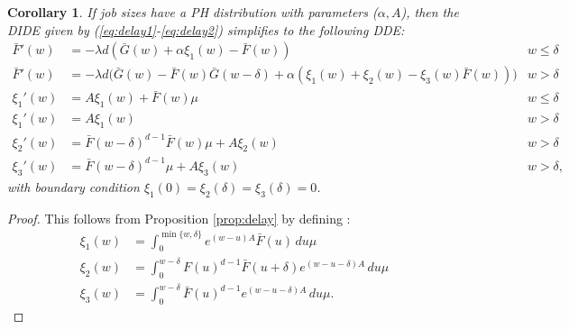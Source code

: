 \documentclass[12pt]{report}
\newtheorem{corollary}[theorem]{Corollary}
\begin{document}
\begin{corollary}
If job sizes have a PH distribution with parameters ($\alpha, A$), then the DIDE given by (\ref{eq:delay1}-\ref{eq:delay2}) simplifies to the following DDE:
\begin{align*}
\bar F'(w) &= -\lambda d (\bar G(w) + \alpha \xi_1(w) - \bar F(w)) & w \leq \delta\\
\bar F'(w) &= -\lambda d \bigg( \bar G(w) - \bar F(w) \bar G(w-\delta) + \alpha (\xi_1(w) + \xi_2(w) - \xi_3(w) \bar F(w)) \bigg) & w > \delta\\
\xi_1'(w) &= A \xi_1(w) + \bar F(w) \mu & w \leq \delta\\
\xi_1'(w) &= A \xi_1(w) & w > \delta\\
\xi_2'(w) &= \bar F(w-\delta)^{d-1} \bar F(w) \mu + A \xi_2(w) & w > \delta\\
\xi_3'(w) &= \bar F(w-\delta)^{d-1} \mu + A \xi_3(w) & w > \delta,
\end{align*}
with boundary condition $\xi_1(0) = \xi_2(\delta) = \xi_3(\delta) = 0$.
\end{corollary}
\begin{proof}
This follows from Proposition \ref{prop:delay} by defining :
\begin{align*}
\xi_1(w) & = \int_0^{\min\{w,\delta\}} e^{(w-u)A} \bar F(u) \, du \mu \\
\xi_2(w) &= \int_0^{w-\delta} F(u)^{d-1} \bar F(u+\delta) e^{(w-u-\delta)A} \, du \mu\\
\xi_3(w) &= \int_0^{w-\delta} \bar F(u)^{d-1} e^{(w-u-\delta)A} \, du \mu.
\end{align*}
\end{proof}
\color{black}
\end{document}
